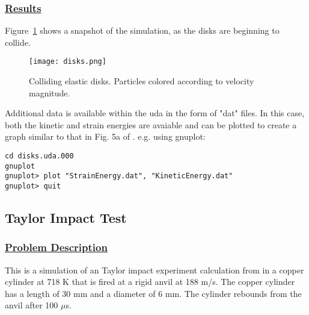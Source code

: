 \subsubsection*{\underline{Results}}

Figure~\ref{figdisks} shows a snapshot of the simulation, as the disks
are beginning to collide.
\begin{figure}
  \center
  \texttt{[image: disks.png]}
  \caption{Colliding elastic disks.  Particles colored according to
velocity magnitude.}
  \label{figdisks}
\end{figure}

Additional data is available within the uda in the form of "dat" files.
In this case, both the kinetic and strain energies are avaiable and can
be plotted to create a graph similar to that in Fig. 5a of \cite{Sulsky1994}.
e.g. using gnuplot:

\begin{lstlisting}[backgroundcolor=\color{background}]
cd disks.uda.000
gnuplot
gnuplot> plot "StrainEnergy.dat", "KineticEnergy.dat"
gnuplot> quit
\end{lstlisting}
%
\newpage
\subsection*{\center Taylor Impact Test}
\subsubsection*{\underline{Problem Description}}
This is a simulation of an Taylor impact experiment calculation from 
\cite{Gust1982} in a copper cylinder at 718 K that is fired at a
rigid anvil at 188 m/s.  The copper cylinder has a length of 30 mm and
a diameter of 6 mm.  The cylinder rebounds from the anvil after 100 $\mu$s.
 
